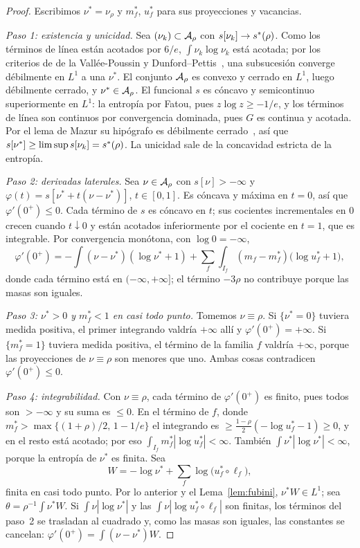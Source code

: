 \begin{proof}
Escribimos $\nu^*=\nu_\rho$ y $m^*_f$, $u^*_f$ para sus proyecciones y vacancias.

\emph{Paso 1: existencia y unicidad.} Sea $(\nu_k)\subset{\mathcal{A}}_\rho$ con $s[\nu_k]\to s^{*}(\rho)$.
Como los términos de línea están acotados por $6/e$, $\int\nu_k\log\nu_k$ está acotada; por los
criterios de de la Vallée-Poussin y Dunford--Pettis~\cite{Bogachev}, una subsucesión converge
débilmente en $L^1$ a una $\nu^*$. El conjunto ${\mathcal{A}}_\rho$ es convexo y cerrado en $L^1$, luego
débilmente cerrado, y $\nu^*\in{\mathcal{A}}_\rho$. El funcional $s$ es cóncavo y semicontinuo superiormente en
$L^1$: la entropía por Fatou, pues $z\log z\ge-1/e$, y los términos de línea son continuos por
convergencia dominada, pues $G$ es continua y acotada. Por el lema de Mazur su hipógrafo es
débilmente cerrado~\cite{Brezis}, así que $s[\nu^*]\ge\limsup s[\nu_k]=s^{*}(\rho)$. La unicidad sale
de la concavidad estricta de la entropía.

\emph{Paso 2: derivadas laterales.} Sea $\nu\in{\mathcal{A}}_\rho$ con $s[\nu]>-\infty$ y
$\varphi(t)=s[\nu^*+t(\nu-\nu^*)]$, $t\in[0,1]$. Es cóncava y máxima en $t=0$, así que
$\varphi'(0^+)\le0$. Cada término de $s$ es cóncavo en $t$; sus cocientes incrementales en $0$ crecen
cuando $t\downarrow0$ y están acotados inferiormente por el cociente en $t=1$, que es integrable. Por
convergencia monótona, con $\log0=-\infty$,
\[
 \varphi'(0^+)=-\int(\nu-\nu^*)(\log\nu^*+1)+\sum_f\int_{I_f}(m_f-m^*_f)\bigl(\log u^*_f+1\bigr),
\]
donde cada término está en $(-\infty,+\infty]$; el término $-3\rho$ no contribuye porque las masas
son iguales.

\emph{Paso 3: $\nu^*>0$ y $m^*_f<1$ en casi todo punto.} Tomemos $\nu\equiv\rho$. Si $\{\nu^*=0\}$
tuviera medida positiva, el primer integrando valdría $+\infty$ allí y $\varphi'(0^+)=+\infty$. Si
$\{m^*_f=1\}$ tuviera medida positiva, el término de la familia $f$ valdría $+\infty$, porque las
proyecciones de $\nu\equiv\rho$ son menores que uno. Ambas cosas contradicen $\varphi'(0^+)\le0$.

\emph{Paso 4: integrabilidad.} Con $\nu\equiv\rho$, cada término de $\varphi'(0^+)$ es finito, pues
todos son $>-\infty$ y su suma es $\le0$. En el término de $f$, donde
$m^*_f>\max\{(1+\rho)/2,\,1-1/e\}$ el integrando es $\ge\frac{1-\rho}2(-\log u^*_f-1)\ge0$, y en el
resto está acotado; por eso $\int_{I_f}m^*_f|\log u^*_f|<\infty$. También
$\int\nu^*|\log\nu^*|<\infty$, porque la entropía de $\nu^*$ es finita. Sea
\[
 W=-\log\nu^*+\sum_f\log\bigl(u^*_f\circ\ell_f\bigr),
\]
finita en casi todo punto. Por lo anterior y el Lema~\ref{lem:fubini}, $\nu^*W\in L^1$; sea
$\theta=\rho^{-1}\int\nu^*W$. Si $\int\nu|\log\nu^*|$ y las
$\int\nu|\log u^*_f\circ\ell_f|$ son finitas, los términos del paso~2 se trasladan al cuadrado y,
como las masas son iguales, las constantes se cancelan: $\varphi'(0^+)=\int(\nu-\nu^*)W$.


\end{proof}
